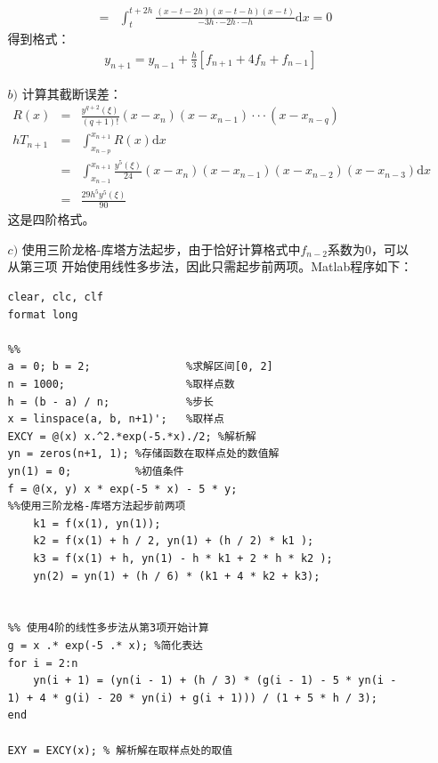 \documentclass[12pt,a4paper,utf8]{ctexart}
\begin{document}
\begin{enumerate}
\begin{enumerate}
\begin{eqnarray}
                                &=& \int_{t}^{t+2h} 
                                    \frac{(x-t-2h)(x-t-h)(x-t)}{-3h\cdot -2h\cdot -h} \mathrm{d}x  =  0  \nonumber 
                    \end{eqnarray}
                    得到格式：
                    \begin{eqnarray} 
                        y_{n+1}=y_{n-1}+\frac{h}{3}[f_{n+1}+4f_{n}+f_{n-1}]
                    \end{eqnarray}
        \item[$b)$] 计算其截断误差：
                    \begin{eqnarray} 
                        R(x) &=& \frac{y^{q+2}(\xi)}{(q+1)!}(x-x_n)(x-x_{n-1})···(x-x_{n-q}) \\
                        hT_{n+1} &=& \int_{x_{n-p}}^{x_{n+1}}R(x)\mathrm{d}x \\
                                 &=& \int_{x_{n-1}}^{x_{n+1}}\frac{y^{5}(\xi)}{24}(x-x_n)(x-x_{n-1})(x-x_{n-2})(x-x_{n-3})\mathrm{d}x\\
                                 &=& \frac{29h^{5}y^{5}(\xi)}{90}
                    \end{eqnarray}
                    这是四阶格式。
        \item[$c)$] 使用三阶龙格-库塔方法起步，由于恰好计算格式中$f_{n-2}$系数为0，可以从第三项
                    开始使用线性多步法，因此只需起步前两项。Matlab程序如下：
                \begin{lstlisting}[frame=single]
clear, clc, clf
format long

%%
a = 0; b = 2;               %求解区间[0, 2]
n = 1000;                   %取样点数
h = (b - a) / n;            %步长
x = linspace(a, b, n+1)';   %取样点
EXCY = @(x) x.^2.*exp(-5.*x)./2; %解析解
yn = zeros(n+1, 1); %存储函数在取样点处的数值解
yn(1) = 0;          %初值条件
f = @(x, y) x * exp(-5 * x) - 5 * y;
%%使用三阶龙格-库塔方法起步前两项
    k1 = f(x(1), yn(1));
    k2 = f(x(1) + h / 2, yn(1) + (h / 2) * k1 );
    k3 = f(x(1) + h, yn(1) - h * k1 + 2 * h * k2 );
    yn(2) = yn(1) + (h / 6) * (k1 + 4 * k2 + k3);


%% 使用4阶的线性多步法从第3项开始计算
g = x .* exp(-5 .* x); %简化表达
for i = 2:n
    yn(i + 1) = (yn(i - 1) + (h / 3) * (g(i - 1) - 5 * yn(i - 1) + 4 * g(i) - 20 * yn(i) + g(i + 1))) / (1 + 5 * h / 3);
end

EXY = EXCY(x); % 解析解在取样点处的取值


\end{lstlisting}
\end{enumerate}
\end{enumerate}
\end{document}
